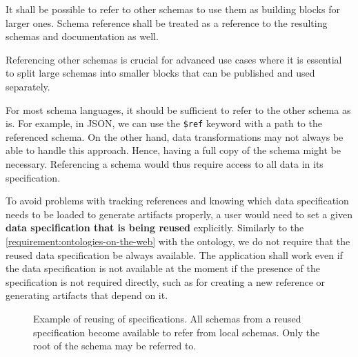 \begin{requirement}
  It shall be possible to refer to other schemas to use them as building blocks for larger ones. Schema reference shall be treated as a reference to the resulting schemas and documentation as well.
  \label{analysis/requirement/schema-reference}
\end{requirement}

Referencing other schemas is crucial for advanced use cases where it is essential to split large schemas into smaller blocks that can be published and used separately.

For most schema languages, it should be sufficient to refer to the other schema as is. For example, in JSON, we can use the \verb|$ref| keyword with a path to the referenced schema. On the other hand, data transformations may not always be able to handle this approach. Hence, having a full copy of the schema might be necessary. Referencing a schema would thus require access to all data in its specification.

To avoid problems with tracking references and knowing which data specification needs to be loaded to generate artifacts properly, a user would need to set a given \textbf{data specification that is being reused} explicitly. Similarly to the \autoref{requirement:ontologies-on-the-web} with the ontology, we do not require that the reused data specification be always available. The application shall work even if the data specification is not available at the moment if the presence of the specification is not required directly, such as for creating a new reference or generating artifacts that depend on it.

\begin{figure}[h!]\centering
  \caption{Example of reusing of specifications. All schemas from a reused specification become available to refer from local schemas. Only the root of the schema may be referred to.}
\end{figure}